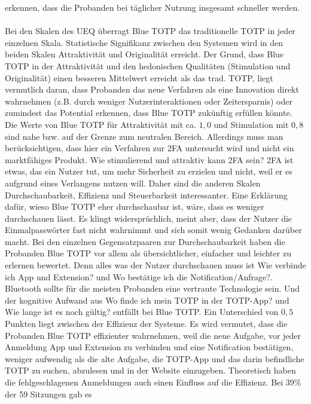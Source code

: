 erkennen, dass die Probanden bei täglicher Nutzung insgesamt schneller werden.
\\\\
Bei den Skalen des UEQ überragt Blue TOTP das traditionelle TOTP in jeder 
einzelnen Skala. Statistische Signifikanz zwischen den Systemen wird in den 
beiden Skalen Attraktivität und Originalität erreicht. Der Grund, dass Blue 
TOTP in der Attraktivität und den hedonischen Qualitäten (Stimulation und 
Originalität) einen besseren Mittelwert erreicht als das trad. TOTP, liegt 
vermutlich daran, dass Probanden das neue Verfahren als eine Innovation direkt 
wahrnehmen (z.B. durch weniger Nutzerinteraktionen oder Zeitersparnis) oder 
zumindest das Potential erkennen, dass Blue TOTP zukünftig erfüllen könnte. 
Die Werte von Blue TOTP für Attraktivität mit ca. $1{,}0$ und Stimulation mit 
$0{,}8$ sind nahe bzw. auf der Grenze zum neutralen Bereich. Allerdings muss 
man berücksichtigen, dass hier ein Verfahren zur 2FA untersucht wird und nicht 
ein marktfähiges Produkt. Wie stimulierend und attraktiv kann 2FA sein? 2FA 
ist etwas, das ein Nutzer tut, um mehr Sicherheit zu erzielen und nicht, weil 
er es aufgrund eines Verlangens nutzen will. Daher sind die anderen Skalen 
Durchschaubarkeit, Effizienz und Steuerbarkeit interessanter. Eine Erklärung 
dafür, wieso Blue TOTP eher durchschaubar ist, wäre, dass es weniger 
durchschauen lässt. Es klingt widersprüchlich, meint aber, dass der Nutzer die 
Einmalpasswörter fast nicht wahrnimmt und sich somit wenig Gedanken darüber 
macht. Bei den einzelnen Gegensatzpaaren zur Durchschaubarkeit haben die 
Probanden Blue TOTP vor allem als übersichtlicher, einfacher und leichter zu 
erlernen bewertet. Denn alles was der Nutzer durchschauen muss ist \glqq Wie 
verbinde ich App und Extension?\grqq{} und \glqq Wo bestätige ich die 
Notification/Anfrage?\grqq{}. Bluetooth sollte für die meisten Probanden eine vertraute Technologie sein. Und der kognitive Aufwand aus \glqq Wo finde ich 
mein TOTP in der TOTP-App?\grqq{} und \glqq Wie lange ist es noch gültig?\grqq{} 
entfällt bei Blue TOTP. Ein Unterschied von $0{,}5$ Punkten liegt zwischen der Effizienz 
der Systeme. Es wird vermutet, dass die Probanden Blue TOTP effizienter 
wahrnehmen, weil die neue Aufgabe, vor jeder Anmeldung App und Extension zu 
verbinden und eine Notification bestätigen, weniger aufwendig als die alte 
Aufgabe, die TOTP-App und das darin befindliche TOTP zu suchen, abzulesen und 
in der Website einzugeben. Theoretisch haben die fehlgeschlagenen Anmeldungen 
auch einen Einfluss auf die Effizienz. Bei $39\%$ der 59 Sitzungen gab es 
